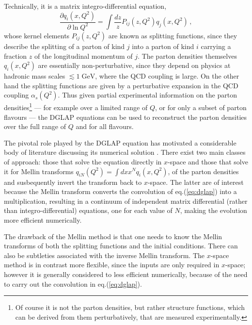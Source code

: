 \documentclass[12pt]{article}
\newcommand{\GeV}{\;\mathrm{GeV}}
\newcommand{\as}{\alpha_s}
\newcommand{\AllDGLAP}{Botje,Schoeffel:1998tz,Pegasus,Pascaud:2001bi,Weinzierl:2002mv,coriano,GuzziThesis}
\begin{document}
Technically, it is a matrix integro-differential equation,
\begin{equation}
  \label{eq:dglap}
  \frac{\partial q_i(x,Q^2)}{\partial \ln Q^2} = \int \frac{dz}{z}
  P_{ij}(z,Q^2) q_j(x,Q^2)\,,
\end{equation}
whose kernel elements $P_{ij}(z,Q^2)$ are known as splitting
functions, since they describe the splitting of a parton of kind $j$
into a parton of kind $i$ carrying a fraction $z$ of the longitudinal
momentum of $j$. The parton densities themselves $q_i(x,Q^2)$ are
essentially non-perturbative, since they depend on physics at hadronic
mass scales $\lesssim 1 \GeV$, where the QCD coupling is large. On the
other hand the splitting functions are given by a perturbative
expansion in the QCD coupling $\as(Q^2)$. Thus given partial
experimental information on the parton densities\footnote{Of course it
  is not the parton densities, but rather structure functions, which
  can be derived from them perturbatively, that are measured
  experimentally.} %
--- for example over a limited range of $Q$, or for only a subset of
parton flavours --- the DGLAP equations can be used to reconstruct the
parton densities over the full range of $Q$ and for all flavours.

The pivotal role played by the DGLAP equation has motivated a
considerable body of literature discussing its numerical solution
\cite{\AllDGLAP}. There exist two main classes of approach: those that
solve the equation directly in $x$-space and those that solve it for
Mellin transforms $q_{iN}(Q^2) = \int dx x^N q_i(x,Q^2)$, of the
parton densities and susbequently invert the transform back to
$x$-space. The latter are of interest because the Mellin transform
converts the convolution of eq.(\ref{eq:dglap}) into a multiplication,
resulting in a continuum of independent matrix differential (rather
than integro-differential) equations, one for each value of $N$,
making the evolution more efficient numerically. 

The drawback of the Mellin method is that one needs to know the Mellin
transforms of both the splitting functions and the initial conditions.
There can also be subtleties associated with the inverse Mellin
transform.
%
The $x$-space method is in contrast more flexible, since the inputs
are only required in $x$-space; however it is generally considered to
less efficient numerically, because of the need to carry out the
convolution in eq.(\ref{eq:dglap}).
\end{document}
